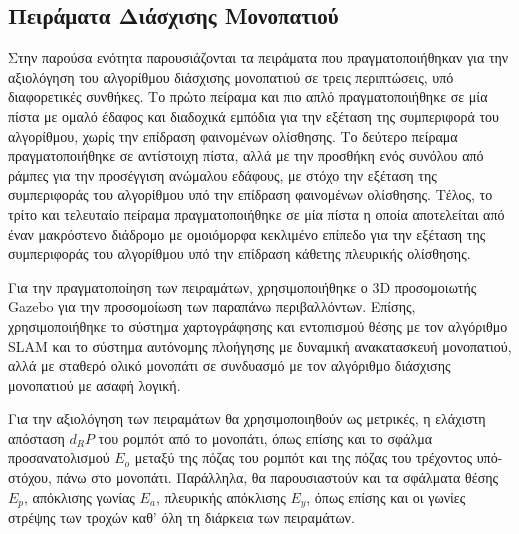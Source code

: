 \subsection{Πειράματα Διάσχισης Μονοπατιού} \label{ssec:path_tracking_experiments}
Στην παρούσα ενότητα παρουσιάζονται τα πειράματα που πραγματοποιήθηκαν για την αξιολόγηση του αλγορίθμου διάσχισης μονοπατιού σε τρεις περιπτώσεις, υπό διαφορετικές συνθήκες. Το πρώτο πείραμα και πιο απλό πραγματοποιήθηκε σε μία πίστα με ομαλό έδαφος και διαδοχικά εμπόδια για την εξέταση της συμπεριφορά του αλγορίθμου, χωρίς την επίδραση φαινομένων ολίσθησης. Το δεύτερο πείραμα πραγματοποιήθηκε σε αντίστοιχη πίστα, αλλά με την προσθήκη ενός συνόλου από ράμπες για την προσέγγιση ανώμαλου εδάφους, με στόχο την εξέταση της συμπεριφοράς του αλγορίθμου υπό την επίδραση φαινομένων ολίσθησης. Τέλος, το τρίτο και τελευταίο πείραμα πραγματοποιήθηκε σε μία πίστα η οποία αποτελείται από έναν μακρόστενο διάδρομο με ομοιόμορφα κεκλιμένο επίπεδο για την εξέταση της συμπεριφοράς του αλγορίθμου υπό την επίδραση κάθετης πλευρικής ολίσθησης.

\bigskip
Για την πραγματοποίηση των πειραμάτων, χρησιμοποιήθηκε ο 3D προσομοιωτής Gazebo για την προσομοίωση των παραπάνω περιβαλλόντων. Επίσης, χρησιμοποιήθηκε το σύστημα χαρτογράφησης και εντοπισμού θέσης με τον αλγόριθμο SLAM και το σύστημα αυτόνομης πλοήγησης με δυναμική ανακατασκευή μονοπατιού, αλλά με σταθερό ολικό μονοπάτι σε συνδυασμό με τον αλγόριθμο διάσχισης μονοπατιού με ασαφή λογική.

\bigskip
Για την αξιολόγηση των πειραμάτων θα χρησιμοποιηθούν ως μετρικές, η ελάχιστη απόσταση $d_RP$ του ρομπότ από το μονοπάτι, όπως επίσης και το σφάλμα προσανατολισμού $E_o$ μεταξύ της πόζας του ρομπότ και της πόζας του τρέχοντος υπό-στόχου, πάνω στο μονοπάτι. Παράλληλα, θα παρουσιαστούν και τα σφάλματα θέσης $E_p$, απόκλισης γωνίας $E_a$, πλευρικής απόκλισης $E_y$, όπως επίσης και οι γωνίες στρέψης των τροχών καθ' όλη τη διάρκεια των πειραμάτων.

